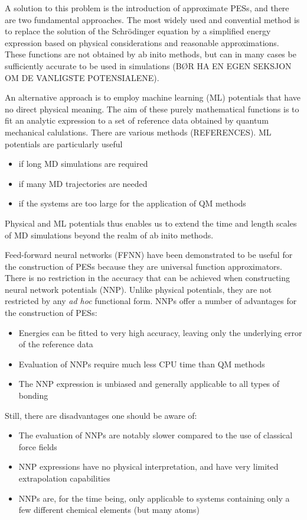 \documentclass[twoside,english]{uiofysmaster}
\begin{document}
A solution to this problem is the introduction of approximate PESs, and there are two fundamental approaches. 
The most widely used and convential method is to replace the solution of the Schrödinger equation by a simplified
energy expression based on physical considerations and reasonable approximations. These functions are not obtained
by ab inito methods, but can in many cases be sufficiently accurate to be used in simulations (BØR HA EN EGEN SEKSJON
OM DE VANLIGSTE POTENSIALENE).

An alternative approach is to employ machine learning (ML) potentials that have no direct physical meaning. 
The aim of these purely mathematical functions is to fit an analytic expression to a set of reference data
obtained by quantum mechanical calulations. There are various methods (REFERENCES). 
ML potentials are particularly useful
\begin{itemize}
 \item if long MD simulations are required
 \item if many MD trajectories are needed
 \item if the systems are too large for the application of QM methods
\end{itemize}
Physical and ML potentials thus enables us to extend the time and length scales of MD simulations
beyond the realm of ab inito methods. 

Feed-forward neural networks (FFNN) have been demonstrated to be useful for the construction of PESs because
they are universal function approximators. There is no restriction in the accuracy that can be achieved when 
constructing neural network potentials (NNP). Unlike physical potentials, they are not restricted by any \textit{ad hoc}
functional form. NNPs offer a number of advantages for the construction of PESs:
\begin{itemize}
 \item Energies can be fitted to very high accuracy, leaving only
 the underlying error of the reference data
 \item Evaluation of NNPs require much less CPU time than QM methods
 \item The NNP expression is unbiased and generally applicable to all types of bonding
\end{itemize}
Still, there are disadvantages one should be aware of:
\begin{itemize}
 \item The evaluation of NNPs are notably slower compared to the use of classical force fields
 \item NNP expressions have no physical interpretation, and have very limited extrapolation capabilities
 \item NNPs are, for the time being, only applicable to systems containing only a few
 different chemical elements (but many atoms)
\end{itemize}
\end{document}
